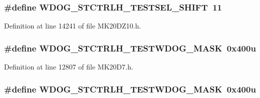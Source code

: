 \subsubsection[{\texorpdfstring{W\+D\+O\+G\+\_\+\+S\+T\+C\+T\+R\+L\+H\+\_\+\+T\+E\+S\+T\+S\+E\+L\+\_\+\+S\+H\+I\+FT}{WDOG_STCTRLH_TESTSEL_SHIFT}}]{\setlength{\rightskip}{0pt plus 5cm}\#define W\+D\+O\+G\+\_\+\+S\+T\+C\+T\+R\+L\+H\+\_\+\+T\+E\+S\+T\+S\+E\+L\+\_\+\+S\+H\+I\+FT~11}\hypertarget{group___w_d_o_g___register___masks_gaf41cdd95d386a6b663fa3adea03699e1}{}\label{group___w_d_o_g___register___masks_gaf41cdd95d386a6b663fa3adea03699e1}


Definition at line 14241 of file M\+K20\+D\+Z10.\+h.

\subsubsection[{\texorpdfstring{W\+D\+O\+G\+\_\+\+S\+T\+C\+T\+R\+L\+H\+\_\+\+T\+E\+S\+T\+W\+D\+O\+G\+\_\+\+M\+A\+SK}{WDOG_STCTRLH_TESTWDOG_MASK}}]{\setlength{\rightskip}{0pt plus 5cm}\#define W\+D\+O\+G\+\_\+\+S\+T\+C\+T\+R\+L\+H\+\_\+\+T\+E\+S\+T\+W\+D\+O\+G\+\_\+\+M\+A\+SK~0x400u}\hypertarget{group___w_d_o_g___register___masks_ga155c6ba1a6269c937ad8a1e1500686aa}{}\label{group___w_d_o_g___register___masks_ga155c6ba1a6269c937ad8a1e1500686aa}


Definition at line 12807 of file M\+K20\+D7.\+h.

\subsubsection[{\texorpdfstring{W\+D\+O\+G\+\_\+\+S\+T\+C\+T\+R\+L\+H\+\_\+\+T\+E\+S\+T\+W\+D\+O\+G\+\_\+\+M\+A\+SK}{WDOG_STCTRLH_TESTWDOG_MASK}}]{\setlength{\rightskip}{0pt plus 5cm}\#define W\+D\+O\+G\+\_\+\+S\+T\+C\+T\+R\+L\+H\+\_\+\+T\+E\+S\+T\+W\+D\+O\+G\+\_\+\+M\+A\+SK~0x400u}\hypertarget{group___w_d_o_g___register___masks_ga155c6ba1a6269c937ad8a1e1500686aa}{}\label{group___w_d_o_g___register___masks_ga155c6ba1a6269c937ad8a1e1500686aa}



